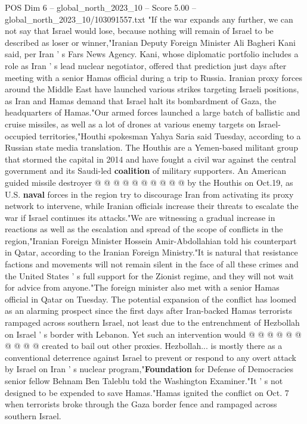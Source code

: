 \begin{textsample}{POS Dim 6 – global\_north\_2023\_10 – Score 5.00 – global\_north\_2023\_10/103091557.txt}  \label{ex:f6_pos_210}
"If the war expands any further, we can not say that Israel would lose, because nothing will remain of Israel to be described as loser or winner,"Iranian Deputy Foreign Minister Ali Bagheri Kani said, per Iran ' s Fars News Agency.
Kani, whose diplomatic portfolio includes a role as Iran ' s lead nuclear negotiator, offered that prediction just days after meeting with a senior Hamas official during a trip to Russia.
Iranian proxy forces around the Middle East have launched various strikes targeting Israeli positions, as Iran and Hamas demand that Israel halt its bombardment of Gaza, the headquarters of Hamas."Our armed forces launched a large batch of ballistic and cruise missiles, as well as a lot of drones at various enemy targets on Israel-occupied territories,"Houthi spokesman Yahya Saria said Tuesday, according to a Russian state media translation.
The Houthis are a Yemen-based militant group that stormed the capital in 2014 and have fought a civil war against the central government and its Saudi-led \textbf{coalition} of military supporters.
An American guided missile destroyer @ @ @ @ @ @ @ @ @ @ by the Houthis on Oct.19, as U.S. \textbf{naval} forces in the region try to discourage Iran from activating its proxy network to intervene, while Iranian officials increase their threats to escalate the war if Israel continues its attacks."We are witnessing a gradual increase in reactions as well as the escalation and spread of the scope of conflicts in the region,"Iranian Foreign Minister Hossein Amir-Abdollahian told his counterpart in Qatar, according to the Iranian Foreign Ministry."It is natural that resistance factions and movements will not remain silent in the face of all these crimes and the United States ' s full support for the Zionist regime, and they will not wait for advice from anyone."The foreign minister also met with a senior Hamas official in Qatar on Tuesday.
The potential expansion of the conflict has loomed as an alarming prospect since the first days after Iran-backed Hamas terrorists rampaged across southern Israel, not least due to the entrenchment of Hezbollah on Israel ' s border with Lebanon.
Yet such an intervention would @ @ @ @ @ @ @ @ @ @ created to bail out other proxies.
Hezbollah... is mostly there as a conventional deterrence against Israel to prevent or respond to any overt attack by Israel on Iran ' s nuclear program,"\textbf{Foundation} for Defense of Democracies senior fellow Behnam Ben Taleblu told the Washington Examiner."It ' s not designed to be expended to save Hamas."Hamas ignited the conflict on Oct. 7 when terrorists broke through the Gaza border fence and rampaged across southern Israel.

\end{textsample}
